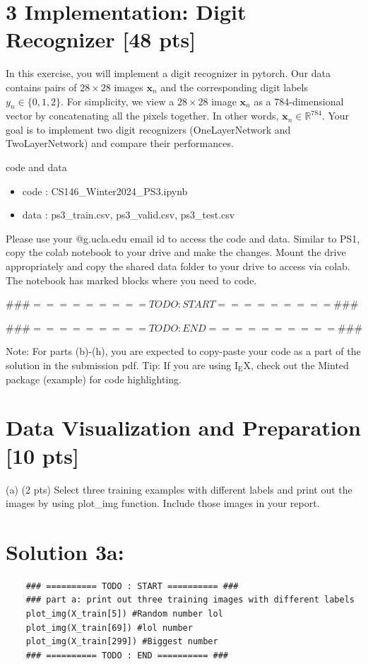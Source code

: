 \documentclass[10pt]{article}
\begin{document}
\section*{3 Implementation: Digit Recognizer [48 pts]}
In this exercise, you will implement a digit recognizer in pytorch. Our data contains pairs of $28 \times 28$ images $\mathbf{x}_{n}$ and the corresponding digit labels $y_{n} \in\{0,1,2\}$. For simplicity, we view a $28 \times 28$ image $\mathbf{x}_{n}$ as a 784-dimensional vector by concatenating all the pixels together. In other words, $\mathbf{x}_{n} \in \mathbb{R}^{784}$. Your goal is to implement two digit recognizers (OneLayerNetwork and TwoLayerNetwork) and compare their performances.

code and data

\begin{itemize}
  \item code : CS146\_Winter2024\_PS3.ipynb
  \item data : ps3\_train.csv, ps3\_valid.csv, ps3\_test.csv
\end{itemize}

Please use your @g.ucla.edu email id to access the code and data. Similar to PS1, copy the colab notebook to your drive and make the changes. Mount the drive appropriately and copy the shared data folder to your drive to access via colab. The notebook has marked blocks where you need to code.

$\# \# \#=========T O D O: S T A R T=========\# \# \#$

$\# \# \#=========T O D O: E N D==========\# \# \#$

Note: For parts (b)-(h), you are expected to copy-paste your code as a part of the solution in the submission pdf. Tip: If you are using $\mathrm{I}_{\mathrm{E}} \mathrm{X}$, check out the Minted package (example) for code highlighting.

\section*{Data Visualization and Preparation [10 pts]}
(a) (2 pts) Select three training examples with different labels and print out the images by using plot\_img function. Include those images in your report.

\section*{Solution 3a:}

\begin{verbatim}
    ### ========== TODO : START ========== ###
    ### part a: print out three training images with different labels
    plot_img(X_train[5]) #Random number lol
    plot_img(X_train[69]) #lol number
    plot_img(X_train[299]) #Biggest number
    ### ========== TODO : END ========== ###
\end{verbatim}
\end{document}
